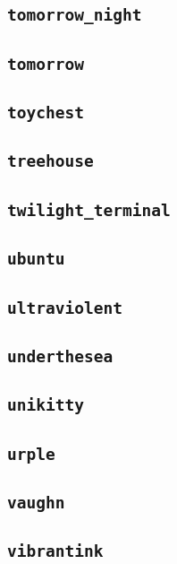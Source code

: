 \subsection{\texttt{tomorrow\_night}}
\newpage
\subsection{\texttt{tomorrow}}
\newpage
\subsection{\texttt{toychest}}
\newpage
\subsection{\texttt{treehouse}}
\newpage
\subsection{\texttt{twilight\_terminal}}
\newpage
\subsection{\texttt{ubuntu}}
\newpage
\subsection{\texttt{ultraviolent}}
\newpage
\subsection{\texttt{underthesea}}
\newpage
\subsection{\texttt{unikitty}}
\newpage
\subsection{\texttt{urple}}
\newpage
\subsection{\texttt{vaughn}}
\newpage
\subsection{\texttt{vibrantink}}
\newpage
